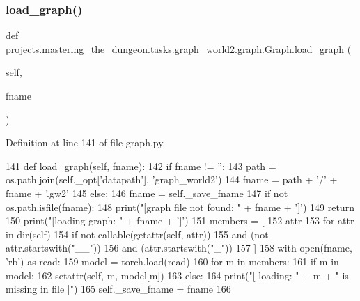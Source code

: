 \subsubsection{\texorpdfstring{load\+\_\+graph()}{load\_graph()}}
{\footnotesize\ttfamily def projects.\+mastering\+\_\+the\+\_\+dungeon.\+tasks.\+graph\+\_\+world2.\+graph.\+Graph.\+load\+\_\+graph (\begin{DoxyParamCaption}\item[{}]{self,  }\item[{}]{fname }\end{DoxyParamCaption})}



Definition at line 141 of file graph.\+py.


\begin{DoxyCode}
141     \textcolor{keyword}{def }load\_graph(self, fname):
142         \textcolor{keywordflow}{if} fname != \textcolor{stringliteral}{''}:
143             path = os.path.join(self.\_opt[\textcolor{stringliteral}{'datapath'}], \textcolor{stringliteral}{'graph\_world2'})
144             fname = path + \textcolor{stringliteral}{'/'} + fname + \textcolor{stringliteral}{'.gw2'}
145         \textcolor{keywordflow}{else}:
146             fname = self.\_save\_fname
147         \textcolor{keywordflow}{if} \textcolor{keywordflow}{not} os.path.isfile(fname):
148             print(\textcolor{stringliteral}{"[graph file not found: "} + fname + \textcolor{stringliteral}{']'})
149             \textcolor{keywordflow}{return}
150         print(\textcolor{stringliteral}{"[loading graph: "} + fname + \textcolor{stringliteral}{']'})
151         members = [
152             attr
153             \textcolor{keywordflow}{for} attr \textcolor{keywordflow}{in} dir(self)
154             \textcolor{keywordflow}{if} \textcolor{keywordflow}{not} callable(getattr(self, attr))
155             \textcolor{keywordflow}{and} (\textcolor{keywordflow}{not} attr.startswith(\textcolor{stringliteral}{"\_\_"}))
156             \textcolor{keywordflow}{and} (attr.startswith(\textcolor{stringliteral}{"\_"}))
157         ]
158         with open(fname, \textcolor{stringliteral}{'rb'}) \textcolor{keyword}{as} read:
159             model = torch.load(read)
160         \textcolor{keywordflow}{for} m \textcolor{keywordflow}{in} members:
161             \textcolor{keywordflow}{if} m \textcolor{keywordflow}{in} model:
162                 setattr(self, m, model[m])
163             \textcolor{keywordflow}{else}:
164                 print(\textcolor{stringliteral}{"[ loading: "} + m + \textcolor{stringliteral}{" is missing in file ]"})
165         self.\_save\_fname = fname
166 
\end{DoxyCode}
